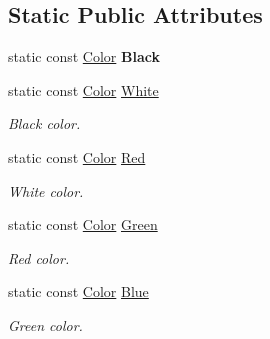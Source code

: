 \subsection*{Static Public Attributes}
\begin{DoxyCompactItemize}
\item 
\mbox{\label{unionarcade_1_1Color_adf9314b9d80e839db37907dc8e281175}} 
static const \hyperlink{unionarcade_1_1Color}{Color} {\bfseries Black}
\item 
\mbox{\label{unionarcade_1_1Color_aa8bd809fbf902dbbe53b9bb6802eb57f}} 
static const \hyperlink{unionarcade_1_1Color}{Color} \hyperlink{unionarcade_1_1Color_aa8bd809fbf902dbbe53b9bb6802eb57f}{White}
\begin{DoxyCompactList}\small\item\em Black color. \end{DoxyCompactList}\item 
\mbox{\label{unionarcade_1_1Color_a7101e34126fdb3c14d53045681938293}} 
static const \hyperlink{unionarcade_1_1Color}{Color} \hyperlink{unionarcade_1_1Color_a7101e34126fdb3c14d53045681938293}{Red}
\begin{DoxyCompactList}\small\item\em White color. \end{DoxyCompactList}\item 
\mbox{\label{unionarcade_1_1Color_aa7271d3c9e5fc07926979eaa610af7e4}} 
static const \hyperlink{unionarcade_1_1Color}{Color} \hyperlink{unionarcade_1_1Color_aa7271d3c9e5fc07926979eaa610af7e4}{Green}
\begin{DoxyCompactList}\small\item\em Red color. \end{DoxyCompactList}\item 
\mbox{\label{unionarcade_1_1Color_a37e72a85b3ce04f4642a48cae2f60644}} 
static const \hyperlink{unionarcade_1_1Color}{Color} \hyperlink{unionarcade_1_1Color_a37e72a85b3ce04f4642a48cae2f60644}{Blue}
\begin{DoxyCompactList}\small\item\em Green color. \end{DoxyCompactList}\item 
\mbox{\label{unionarcade_1_1Color_aa437de4029652dba87b0b64ca488f8ff}} 

\end{DoxyCompactItemize}
